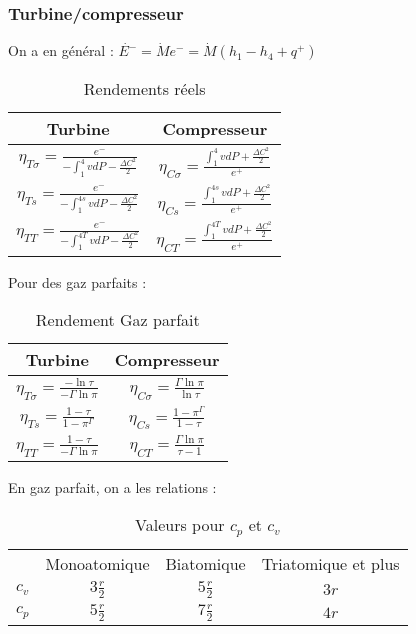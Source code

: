 \documentclass[../main.tex]{subfiles}
\begin{document}
\subsubsection{Turbine/compresseur}
On a en général : $\dot{E^-} = \dot{M}e^- = \dot{M}(h_1-h_4 + q^+)$\\
\begin{table}[hbt!]
    \centering
    \begin{tabular}{c|c}
        Turbine & Compresseur \\
        \hline
        $\eta_{T\sigma} = \frac{e^-}{-\int_1^4 vdP - \frac{\Delta C^2}{2}}$ & $\eta_{C\sigma} = \frac{\int_1^4 vdP + \frac{\Delta C^2}{2}}{e^+}$\\
        $\eta_{Ts} = \frac{e^-}{-\int_1^{4s} vdP - \frac{\Delta C^2}{2}}$ & $\eta_{Cs} = \frac{\int_1^{4s} vdP + \frac{\Delta C^2}{2}}{e^+}$\\
        $\eta_{TT} = \frac{e^-}{-\int_1^{4T} vdP - \frac{\Delta C^2}{2}}$ & $\eta_{CT} = \frac{\int_1^{4T} vdP + \frac{\Delta C^2}{2}}{e^+}$\\
    \end{tabular}
    \caption{Rendements réels}
\end{table}
Pour des gaz parfaits :\\
\begin{table}[hbt!]
    \centering
    \begin{tabular}{c|c}
        Turbine & Compresseur \\
        \hline
        $\eta_{T\sigma} = \frac{-\ln{\tau}}{-\Gamma \ln{\pi}}$& $\eta_{C\sigma} = \frac{\Gamma \ln{\pi}}{\ln{\tau}}$\\
        \hline
        $\eta_{Ts} = \frac{1-\tau}{1-\pi^{\Gamma}}$ & $\eta_{Cs} = \frac{1-\pi^{\Gamma}}{1-\tau}$\\
        \hline
        $\eta_{TT} = \frac{1-\tau}{-\Gamma \ln{\pi}}$ & $\eta_{CT} = \frac{\Gamma \ln{\pi}}{\tau-1}$\\
    \end{tabular}
    \caption{Rendement Gaz parfait}
\end{table}
En gaz parfait, on a les relations : \\
\begin{table}[hbt!]
    \centering
    \begin{tabular}{c|c|c|c}
        \hline
         & Monoatomique & Biatomique & Triatomique et plus \\
        $c_v$ & $3\frac{r}{2}$ & $5\frac{r}{2}$ & $3r$\\ 
        $c_p$ & $5\frac{r}{2}$ & $7\frac{r}{2}$ & $4r$\\
    \end{tabular}
    \caption{Valeurs pour $c_p$ et $c_v$}
\end{table}
\end{document}
